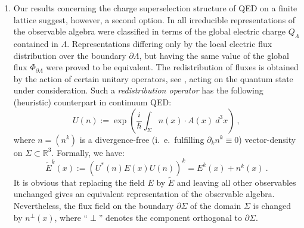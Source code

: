 \documentclass[a4paper,12pt]{article}
\begin{document}
\begin{enumerate}
\item
Our results concerning the charge superselection structure of QED
on a finite lattice \cite{KRT} suggest, however, a second option.
In \cite{KRT} all irreducible representations of the observable
algebra were classified in terms of the global electric charge
$Q_\Lambda$ contained in $\Lambda$. Representations differing only
by the local electric flux distribution over the boundary
$\partial \Lambda$, but having the same value of the global flux
$\Phi_{\partial \Lambda}$ were proved to be equivalent. The
redistribution of fluxes is obtained by the action of certain
unitary operators, see \cite{KRT}, acting on the quantum state
under consideration. Such a {\em redistribution operator} has the
following (heuristic) counterpart in continuum QED:
\begin{equation}\label{U-continuum}
  U(n) := \exp \left(\frac{i}{\hbar} \int_{\Sigma} n(x)
  \cdot A(x) \  d^3 x \right) \ ,
\end{equation}
where $n  = (n^{k})$ is a divergence-free (i.~e.~fulfilling
$\partial_k  n^{k} \equiv 0$) vector-density on $\Sigma \subset
{\mathbb R}^3$. Formally, we have:
\begin{equation}\label{E-continuum}
  {\tilde E}^k(x) :=  \left( U^*(n) E(x) U(n) \right)^k =
  E^k (x) + n^k (x) \ .
\end{equation}
It is obvious that replacing the field $E$ by ${\tilde E}$ and
leaving all other observables unchanged gives an equivalent
representation of the observable algebra. Nevertheless, the flux
field on the boundary $\partial \Sigma$ of the domain $\Sigma$ is
changed by $n^{\perp}(x)$, where ``$\perp$'' denotes the component
orthogonal to $\partial \Sigma$.


\end{enumerate}
\end{document}
